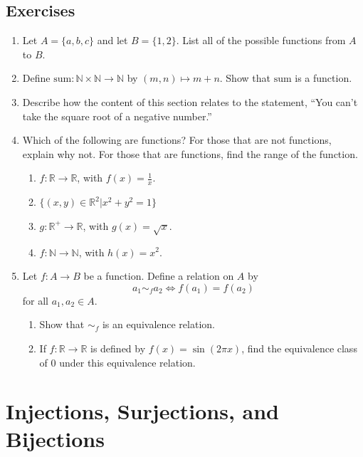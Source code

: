 \documentclass[
]{book}
\theoremstyle{definition}
\theoremstyle{definition}
\theoremstyle{definition}
\theoremstyle{definition}
\theoremstyle{remark}
\begin{document}
\hypertarget{exercises-16}{%
\subsection{Exercises}\label{exercises-16}}

\begin{enumerate}
\def\labelenumi{\arabic{enumi}.}
\item
  Let \(A=\{a,b,c\}\) and let \(B=\{1,2\}\). List all of the possible functions from \(A\) to \(B\).
\item
  Define \(\mathrm{sum}:\mathbb{N}\times \mathbb{N} \rightarrow \mathbb{N}\) by \((m,n) \mapsto m+n\). Show that \(\mathrm{sum}\) is a function.
\item
  Describe how the content of this section relates to the statement, ``You can't take the square root of a negative number.''
\item
  Which of the following are functions? For those that are not functions, explain why not. For those that are functions, find the range of the function.

  \begin{enumerate}
  \def\labelenumii{\alph{enumii}.}
  \item
    \(f:\mathbb{R} \rightarrow \mathbb{R}\), with \(f(x)=\frac{1}{x}\).
  \item
    \(\{(x,y)\in \mathbb{R}^2\vert x^2+y^2=1\}\)
  \item
    \(g:\mathbb{R}^+ \rightarrow \mathbb{R}\), with \(g(x)=\sqrt{x}\).
  \item
    \(f:\mathbb{N} \rightarrow \mathbb{N}\), with \(h(x)=x^2\).
  \end{enumerate}
\item
  Let \(f:A\rightarrow B\) be a function. Define a relation on \(A\) by \[a_1 \sim_f a_2 \Leftrightarrow f(a_1)=f(a_2)\] for all \(a_1,a_2\in A\).

  \begin{enumerate}
  \def\labelenumii{\alph{enumii}.}
  \item
    Show that \(\sim_f\) is an equivalence relation.
  \item
    If \(f:\mathbb{R} \rightarrow \mathbb{R}\) is defined by \(f(x)=\sin(2\pi x)\), find the equivalence class of \(0\) under this equivalence relation.
  \end{enumerate}
\end{enumerate}

\hypertarget{sec:Bijection}{%
\section{Injections, Surjections, and Bijections}\label{sec:Bijection}}
\end{document}
